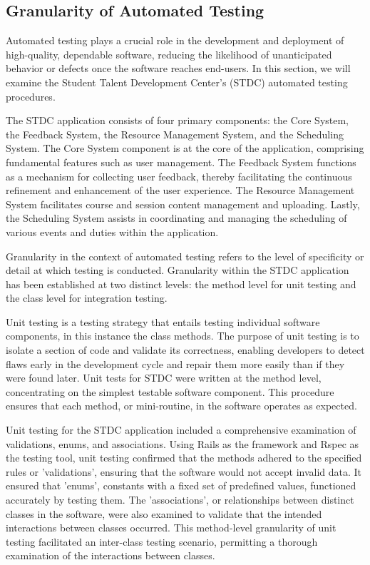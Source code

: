 \subsection{Granularity of Automated Testing}
\begin{justify}
Automated testing plays a crucial role in the development and deployment of high-quality, dependable software, reducing the likelihood of unanticipated behavior or defects once the software reaches end-users. In this section, we will examine the Student Talent Development Center's (STDC) automated testing procedures.


\vspace{0.25cm}
\newendline The STDC application consists of four primary components: the Core System, the Feedback System, the Resource Management System, and the Scheduling System. The Core System component is at the core of the application, comprising fundamental features such as user management. The Feedback System functions as a mechanism for collecting user feedback, thereby facilitating the continuous refinement and enhancement of the user experience. The Resource Management System facilitates course and session content management and uploading. Lastly, the Scheduling System assists in coordinating and managing the scheduling of various events and duties within the application.

\vspace{0.25cm}
\newendline Granularity in the context of automated testing refers to the level of specificity or detail at which testing is conducted. Granularity within the STDC application has been established at two distinct levels: the method level for unit testing and the class level for integration testing.

\vspace{0.25cm}
\newendline Unit testing is a testing strategy that entails testing individual software components, in this instance the class methods. The purpose of unit testing is to isolate a section of code and validate its correctness, enabling developers to detect flaws early in the development cycle and repair them more easily than if they were found later. Unit tests for STDC were written at the method level, concentrating on the simplest testable software component. This procedure ensures that each method, or mini-routine, in the software operates as expected.

\vspace{0.25cm}
\newendline Unit testing for the STDC application included a comprehensive examination of validations, enums, and associations. Using Rails as the framework and Rspec as the testing tool, unit testing confirmed that the methods adhered to the specified rules or 'validations', ensuring that the software would not accept invalid data. It ensured that 'enums', constants with a fixed set of predefined values, functioned accurately by testing them. The 'associations', or relationships between distinct classes in the software, were also examined to validate that the intended interactions between classes occurred. This method-level granularity of unit testing facilitated an inter-class testing scenario, permitting a thorough examination of the interactions between classes.


\end{justify}
